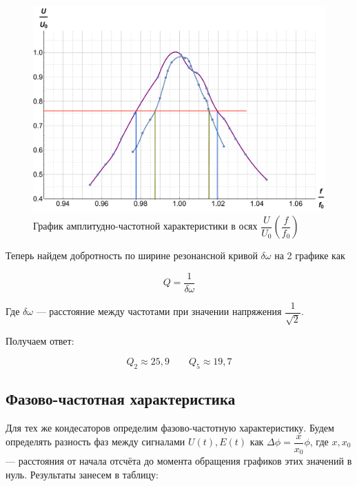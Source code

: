 \documentclass[12pt]{kiarticle}
\begin{document}
\begin{figure}[h!]
	\includegraphics[scale=0.5]{fff.pdf}
	\caption{График амплитудно-частотной характеристики в осях $ \dfrac{U}{U_0} \left( \dfrac{f}{f_0} \right) $ }
\end{figure}

Теперь найдем добротность по ширине резонансной кривой $ \delta\omega $ на 2 графике как 

\begin{equation}\label{}
Q = \dfrac{1}{\delta\omega}
\end{equation}  

Где $ \delta\omega $ --- расстояние между частотами при значении напряжения $ \dfrac{1}{\sqrt{2}} $.

Получаем ответ: 

\begin{equation}\label{}
Q_2 \approx 25,9 \qquad Q_5 \approx 19,7
\end{equation}

\subsection{Фазово-частотная характеристика}

Для тех же кондесаторов определим фазово-частотную характеристику. Будем определять разность фаз между сигналами $ U(t), E(t) $ как $ \Delta\phi = \dfrac{x}{x_0}\phi $, где $ x, x_0 $ --- расстояния от начала отсчёта до момента обращения графиков этих значений в нуль. Результаты занесем в таблицу:
\end{document}
